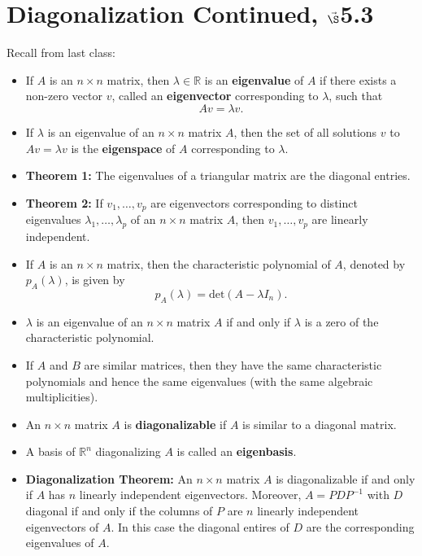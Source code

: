


%

%
%
\section{{Diagonalization Continued, $\vec\S$5.3}}%
% 

%
\thispagestyle{fancy}

Recall from last class:

\begin{itemize}
\item If $A$ is an $n \times n$ matrix, then $\lambda \in \mathbb{R}$ is an {\bf eigenvalue} of $A$ if there exists a non-zero vector $v$, called an {\bf eigenvector} corresponding to $\lambda$, such that $$Av=\lambda v.$$
\item If $\lambda$ is an eigenvalue of an $n \times n$ matrix $A$, then the set of all solutions $v$ to $Av = \lambda v$ is the {\bf eigenspace} of $A$ corresponding to $\lambda$.
\item {\bf Theorem 1:} The eigenvalues of a triangular matrix are the diagonal entries.
\item {\bf Theorem 2:} If $v_1, \dots, v_p$ are eigenvectors corresponding to distinct eigenvalues $\lambda_1, \dots, \lambda_p$ of an $n\times n$ matrix $A$, then $v_1, \dots, v_p$ are linearly independent.
\item If $A$ is an $n\times n$ matrix, then the characteristic polynomial of $A$, denoted by $p_A(\lambda)$, is given by $$p_A(\lambda)=\text{det}(A-\lambda I_n).$$
\item $\lambda$ is an eigenvalue of an $n\times n$ matrix $A$ if and only if $\lambda$ is a zero of the characteristic polynomial.
\item If $A$ and $B$ are similar matrices, then they have the same characteristic polynomials and hence the same eigenvalues (with the same algebraic multiplicities). 
\item An $n\times n$ matrix $A$ is {\bf diagonalizable} if $A$ is similar to a diagonal matrix.
\item A basis of $\mathbb{R}^n$ diagonalizing $A$ is called an {\bf eigenbasis}. 
\item {\bf Diagonalization Theorem:} An $n \times n$ matrix $A$ is diagonalizable if and only if $A$ has $n$ linearly independent eigenvectors. Moreover, $A=PDP^{-1}$ with $D$ diagonal if and only if the columns of $P$ are $n$ linearly independent eigenvectors of $A$. In this case the diagonal entires of $D$ are the corresponding eigenvalues of $A$.
\end{itemize}



